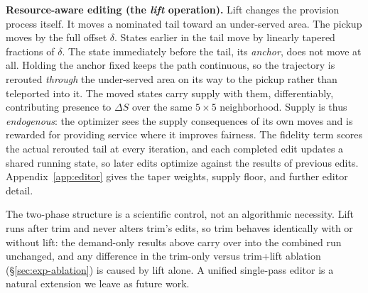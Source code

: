 \textbf{Resource-aware editing (the \emph{lift} operation).} Lift changes the
provision process itself. It moves a nominated tail toward an under-served
area. The pickup moves by the full offset $\delta$. States earlier in the tail
move by linearly tapered fractions of $\delta$. The state immediately before
the tail, its \emph{anchor}, does not move at all. Holding the anchor fixed
keeps the path continuous, so the trajectory is rerouted \emph{through} the
under-served area on its way to the pickup rather than teleported into it. The moved states carry supply with them, differentiably,
contributing presence to $\Delta S$ over the same $5{\times}5$ neighborhood.
Supply is thus \emph{endogenous}: the optimizer sees the supply consequences
of its own moves and is rewarded for providing service where it improves
fairness. The fidelity term scores the actual rerouted tail at every
iteration, and each completed edit updates a shared running state, so later
edits optimize against the results of previous edits.
Appendix~\ref{app:editor} gives the taper weights, supply floor, and further
editor detail.

The two-phase structure is a scientific control, not an algorithmic
necessity. Lift runs after trim and never alters trim's edits, so trim
behaves identically with or without lift: the demand-only results above carry
over into the combined run unchanged, and any difference in the trim-only
versus trim+lift ablation
(\S\ref{sec:exp-ablation}) is caused by lift alone. A unified single-pass editor is a natural extension we
leave as future work.

